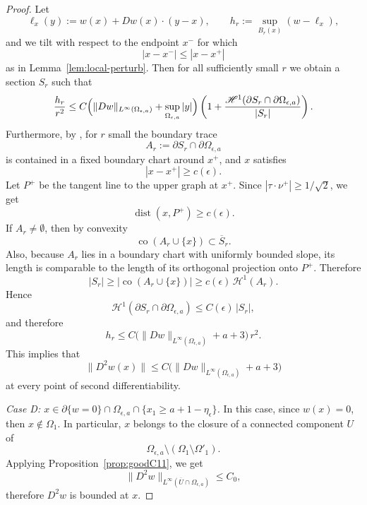\documentclass[reqno,11pt]{amsart}
\def\dist{{\mathop\mathrm{dist}}}
\numberwithin{equation}{section}
\theoremstyle{remark}
\begin{document}
\begin{proof}
Let
\[
\ell_x(y):=w(x)+Dw(x)\cdot(y-x),
\qquad
h_r:=\sup_{B_r(x)}(w-\ell_x),
\]
and we tilt with respect to the 
endpoint $x^-$ for which
$$|x-x^-|\le |x-x^+|$$
as in Lemma~\ref{lem:local-perturb}. Then for all sufficiently
small $r$ we obtain a section $S_r$ such that
\[
\frac{h_r}{r^2}
\le
C\Bigl(\|Dw\|_{L^\infty(\Omega_{\epsilon,a})}
+\sup_{\Omega_{\epsilon,a}}|y|\Bigr)
\left(
1+\frac{\mathscr H^1(\partial S_r\cap\partial\Omega_{\epsilon,a})}{|S_r|}
\right).
\]
Furthermore, by \cite[Proof of Theorem~4.1]{MRZ20252}, for $r$ small the boundary trace
\[
A_r:=\partial S_r\cap\partial\Omega_{\epsilon,a}
\]
is contained in a fixed boundary chart around $x^+$, and  
$x$ satisfies
\[
|x-x^+|\ge c(\epsilon).
\]
Let $P^+$ be the tangent line to the upper graph at $x^+$.
Since $|\tau\cdot \nu^+|\ge 1/\sqrt2$, we get
\[
\dist(x,P^+)\ge c(\epsilon).
\]
If $A_r\neq\emptyset$, then by convexity
\[
\operatorname{co}(A_r\cup\{x\})\subset \overline S_r.
\]
Also, because $A_r$ lies in a boundary chart with uniformly bounded slope, its length is
comparable to the length of its orthogonal projection onto $P^+$.
Therefore
\[
|S_r|
\ge \bigl|\operatorname{co}(A_r\cup\{x\})\bigr|
\ge c(\epsilon)\,\mathscr H^1(A_r).
\]
Hence
\[
\mathscr H^1(\partial S_r\cap\partial\Omega_{\epsilon,a})
\le C(\epsilon)\,|S_r|,
\]
and therefore
\begin{equation}\label{tau-r2-est}
h_r
\le
C\bigl(\|Dw\|_{L^\infty(\Omega_{\epsilon,a})}+a+3\bigr)\,r^2.
\end{equation}
This implies that
\[
\|D^2w(x)\|
\le C\bigl(\|Dw\|_{L^\infty(\Omega_{\epsilon,a})}+a+3\bigr)
\]
at every point of second differentiability.

\smallskip
\noindent\emph{Case D: $x\in \partial\{w=0\}\cap\Omega_{\epsilon,a}\cap\{x_1\ge a+1-\eta_\epsilon\}$.}
In this case, since $w(x)=0$, then $x\notin \Omega_{1}$. In particular,  $x$ belongs to the closure of a connected
component $U$ of
\[
\Omega_{\epsilon,a}\setminus(\Omega_{1}\setminus\Omega'_1).
\]
Applying Proposition~\ref{prop:goodC11}, we get
\[
\|D^2w\|_{L^\infty(\overline U\cap\Omega_{\epsilon,a})}\le C_0,
\]
therefore $D^2w$ is bounded at $x$.




\end{proof}
\end{document}
